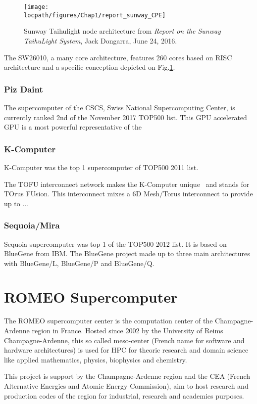 \begin{figure}
\centering
\texttt{[image: \\locpath/figures/Chap1/report\_sunway\_CPE]}
\caption{Sunway Taihulight node architecture from \textit{Report on the Sunway TaihuLight System}, Jack Dongarra, June 24, 2016.}
\label{fig:chap1_report_sunway_CPE}
\end{figure}

The SW26010, a many core architecture, features 260 cores based on RISC architecture and a specific conception depicted on Fig.\ref{fig:chap1_report_sunway_CPE}.

\subsubsection{Piz Daint}
The supercomputer of the CSCS, Swiss National Supercomputing Center, is currently ranked 2nd of the November 2017 TOP500 list. 
This GPU accelerated GPU is a most powerful representative of the  

\subsubsection{K-Computer}
K-Computer was the top 1 supercomputer of TOP500 2011 list. 

The TOFU interconnect network makes the K-Computer unique~\cite{ajima2009tofu} and stands for TOrus FUsion.
This interconnect mixes a 6D Mesh/Torus interconnect to provide up to  ...

\subsubsection{Sequoia/Mira}
Sequoia supercomputer was top 1 of the TOP500 2012 list. 
It is based on BlueGene from IBM.
The BlueGene project made up to three main architectures with BlueGene/L, BlueGene/P and BlueGene/Q.

\section{ROMEO Supercomputer}

The ROMEO supercomputer center is the computation center of the Champagne-Ardenne region in France. 
Hosted since 2002 by the University of Reims Champagne-Ardenne, this so called meso-center (French name for software and hardware architectures) is used for HPC for theoric research and domain science like applied mathematics, physics, biophysics and chemistry. 

This project is support by the Champagne-Ardenne region and the CEA (French Alternative Energies and Atomic Energy Commission), aim to host research and production codes of the region for industrial, research and academics purposes. 

